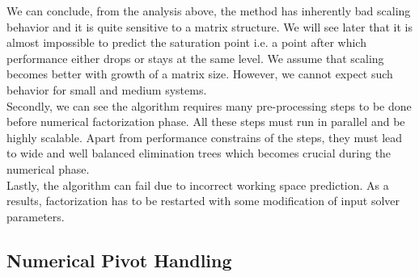 We can conclude, from the analysis above, the method has inherently bad scaling behavior and it is quite sensitive to a matrix structure. We will see later that it is almost impossible to predict the saturation point i.e. a point after which performance either drops or stays at the same level. We assume that scaling becomes better with growth of a matrix size. However, we cannot expect such behavior for small and medium systems.\\  


Secondly, we can see the algorithm requires many pre-processing steps to be done before numerical factorization phase. All these steps must run in parallel and be highly scalable. Apart from performance constrains of the steps, they must lead to wide and well balanced elimination trees which becomes crucial during the numerical phase.\\


Lastly, the algorithm can fail due to incorrect  working space prediction. As a results, factorization has to be restarted with some modification of input solver parameters.\\



\subsection{Numerical Pivot Handling}
\label{subseq:pivot-hadling}

